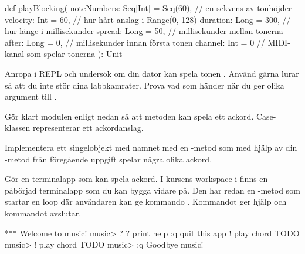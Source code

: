 \begin{Code}
def playBlocking(
  noteNumbers: Seq[Int] = Seq(60), // en sekvens av tonhöjder
  velocity: Int         = 60,      // hur hårt anslag i Range(0, 128)
  duration: Long        = 300,     // hur länge i millisekunder
  spread:   Long        = 50,      // millisekunder mellan tonerna
  after:    Long        = 0,       // millisekunder innan första tonen
  channel:  Int         = 0        // MIDI-kanal som spelar tonerna
): Unit
\end{Code}


\Task Anropa  i REPL och undersök om din dator kan spela tonen . Använd gärna lurar så att du inte stör dina labbkamrater. Prova vad som händer när du ger olika argument till .

\Task Gör klart modulen  enligt nedan så att metoden  kan spela ett ackord. Case-klassen  representerar ett ackordanslag.


\Task Implementera ett singelobjekt med namnet  med en -metod som med hjälp av din -metod från föregående uppgift spelar några olika ackord.





\Task Gör en terminalapp som kan spela ackord. I kursens workspace i  finns en påbörjad terminalapp som du kan bygga vidare på. Den har redan en -metod som startar en loop där användaren kan ge kommando . Kommandot  ger hjälp och kommandot  avslutar.

\begin{REPL}
*** Welcome to music!
music> ?
?         print help
:q        quit this app
!         play chord TODO
music> !
play chord TODO
music> :q
Goodbye music!
\end{REPL}

